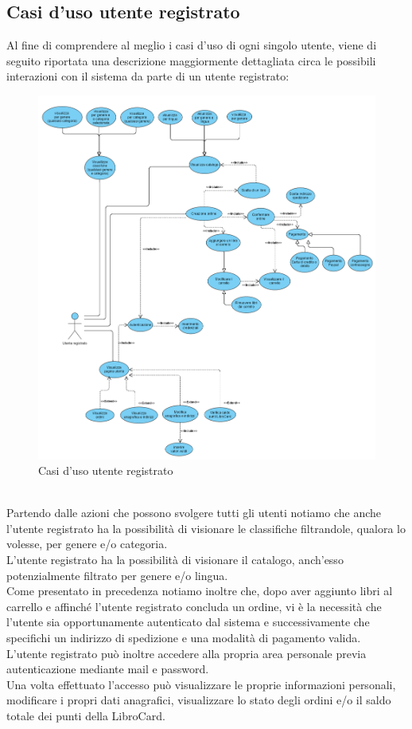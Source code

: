 \documentclass[a4paper,11pt]{report}
\begin{document}
\subsection{Casi d'uso utente registrato}
Al fine di comprendere al meglio i casi d'uso di ogni singolo utente, viene di seguito riportata una descrizione maggiormente dettagliata circa le possibili interazioni con il sistema da parte di un utente registrato:
\begin{figure}[h!]
	\centering
	\includegraphics[width=1.1\linewidth]{Use cases diagrams/utente registrato.png}
	\caption{Casi d'uso utente registrato}
\end{figure}\\
Partendo dalle azioni che possono svolgere tutti gli utenti notiamo che anche l'utente registrato ha la possibilità di visionare le classifiche filtrandole, qualora lo volesse, per genere e/o categoria.\\
\newpage
L'utente registrato ha la possibilità di visionare il catalogo, anch'esso potenzialmente filtrato per genere e/o lingua.\\
Come presentato in precedenza notiamo inoltre che, dopo aver aggiunto libri al carrello e affinché l'utente registrato concluda un ordine, vi è la necessità che l'utente sia opportunamente autenticato dal sistema e successivamente che specifichi un indirizzo di spedizione e una modalità di pagamento valida.\\
L'utente registrato può inoltre accedere alla propria area personale previa autenticazione mediante mail e password.\\
Una volta effettuato l'accesso può visualizzare le proprie informazioni personali, modificare i propri dati anagrafici, visualizzare lo stato degli ordini e/o il saldo totale dei punti della LibroCard.
\end{document}

